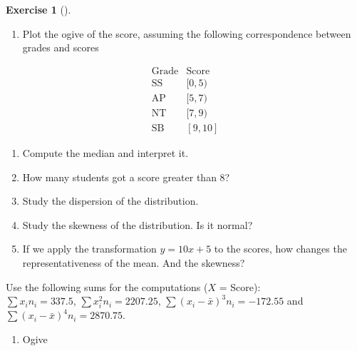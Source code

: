 \documentclass[
  a4paper,
]{scrreport}
\providecommand{\tightlist}{%
  \setlength{\itemsep}{0pt}\setlength{\parskip}{0pt}}\usepackage{longtable,booktabs,array}
\theoremstyle{definition}
\newtheorem{exercise}{Exercise}[chapter]
\theoremstyle{remark}
\begin{document}
\begin{exercise}[]
\begin{figure}[H]
{}

\end{figure}

\begin{enumerate}
\def\labelenumi{\alph{enumi}.}
\tightlist
\item
  Plot the ogive of the score, assuming the following correspondence
  between grades and scores
\end{enumerate}

\[
\begin{array}{lc}
  \mbox{Grade} & \mbox{Score}\\
  \mbox{SS} & [0, 5)\\
  \mbox{AP} & [5, 7)\\
  \mbox{NT} & [7,9)\\
  \mbox{SB} & [9,10]
\end{array}
\]

\begin{enumerate}
\def\labelenumi{\alph{enumi}.}
\item
  Compute the median and interpret it.
\item
  How many students got a score greater than 8?
\item
  Study the dispersion of the distribution.
\item
  Study the skewness of the distribution. Is it normal?
\item
  If we apply the transformation \(y=10x+5\) to the scores, how changes
  the representativeness of the mean. And the skewness?
\end{enumerate}

Use the following sums for the computations (\(X\) = Score):\\
\(\sum x_in_i=337.5\), \(\sum x_i^2n_i=2207.25\),
\(\sum (x_i-\bar x)^3n_i=-172.55\) and
\(\sum (x_i-\bar x)^4n_i=2870.75\).

\begin{tcolorbox}[enhanced jigsaw, opacitybacktitle=0.6, breakable, toptitle=1mm, colbacktitle=quarto-callout-tip-color!10!white, colframe=quarto-callout-tip-color-frame, toprule=.15mm, rightrule=.15mm, bottomrule=.15mm, coltitle=black, left=2mm, bottomtitle=1mm, title=\textcolor{quarto-callout-tip-color}{\faLightbulb}\hspace{0.5em}{Solution}, titlerule=0mm, arc=.35mm, opacityback=0, leftrule=.75mm, colback=white]

\begin{enumerate}
\def\labelenumi{\alph{enumi}.}
\tightlist
\item
  Ogive
\end{enumerate}


\end{tcolorbox}
\end{exercise}
\end{document}

